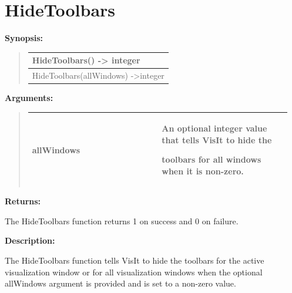 \documentclass[letterpaper,10pt,english]{sphinxmanual}
\begin{document}
\section{HideToolbars}
\label{functions:hidetoolbars}
\begin{DUlineblock}{0em}
\item[] \textbf{Synopsis:}
\end{DUlineblock}
\begin{quote}

\begin{tabulary}{\linewidth}{|L|}
\hline

HideToolbars() -\textgreater{} integer
\\
\hline
HideToolbars(allWindows) -\textgreater{}integer
\\
\hline\end{tabulary}

\end{quote}

\begin{DUlineblock}{0em}
\item[] 
\item[] \textbf{Arguments:}
\end{DUlineblock}
\begin{quote}

\begin{tabular}{|p{0.475\linewidth}|p{0.475\linewidth}|}
\hline

allWindows
 & 
\begin{DUlineblock}{0em}
\item[] An optional integer value that tells VisIt to hide the
\item[] toolbars for all windows when it is non-zero.
\end{DUlineblock}
\\
\hline\end{tabular}

\end{quote}

\begin{DUlineblock}{0em}
\item[] 
\item[] \textbf{Returns:}
\item[] The HideToolbars function returns 1 on success and 0 on failure.
\item[] 
\item[] \textbf{Description:}
\item[] The HideToolbars function tells VisIt to hide the toolbars for the active
visualization window or for all visualization windows when the optional
allWindows argument is provided and is set to a non-zero value.
\end{DUlineblock}
\end{document}
